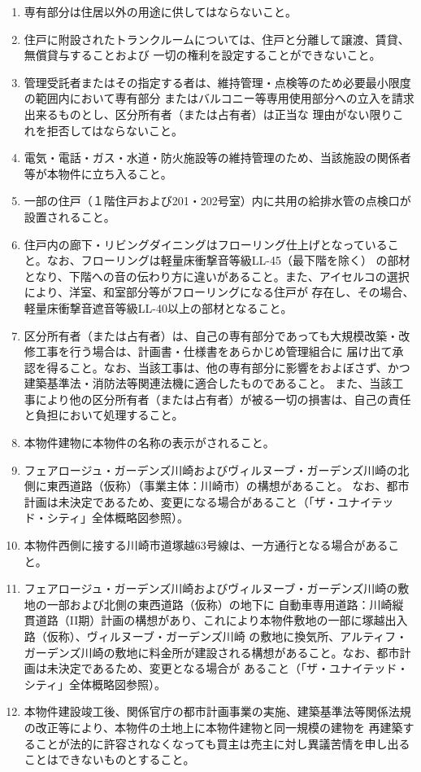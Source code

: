 \documentclass[12pt,uplatex,dvipdfmx]{jsarticle}
\begin{document}
\begin{enumerate}
\item 専有部分は住居以外の用途に供してはならないこと。
\item 住戸に附設されたトランクルームについては、住戸と分離して譲渡、賃貸、無償貸与することおよび
      一切の権利を設定することができないこと。
\item 管理受託者またはその指定する者は、維持管理・点検等のため必要最小限度の範囲内において専有部分
      またはバルコニー等専用使用部分への立入を請求出来るものとし、区分所有者（または占有者）は正当な
      理由がない限りこれを拒否してはならないこと。
\item 電気・電話・ガス・水道・防火施設等の維持管理のため、当該施設の関係者等が本物件に立ち入ること。
\item 一部の住戸（１階住戸および201・202号室）内に共用の給排水管の点検口が設置されること。
\item 住戸内の廊下・リビングダイニングはフローリング仕上げとなっていること。なお、フローリングは軽量床衝撃音等級LL-45（最下階を除く）
      の部材となり、下階への音の伝わり方に違いがあること。また、アイセルコの選択により、洋室、和室部分等がフローリングになる住戸が
      存在し、その場合、軽量床衝撃音遮音等級LL-40以上の部材となること。
\item 区分所有者（または占有者）は、自己の専有部分であっても大規模改築・改修工事を行う場合は、計画書・仕様書をあらかじめ管理組合に
      届け出て承認を得ること。なお、当該工事は、他の専有部分に影響をおよぼさず、かつ建築基準法・消防法等関連法機に適合したものであること。
      また、当該工事により他の区分所有者（または占有者）が被る一切の損害は、自己の責任と負担において処理すること。
\item 本物件建物に本物件の名称の表示がされること。
\item フェアロージュ・ガーデンズ川崎およびヴィルヌーブ・ガーデンズ川崎の北側に東西道路（仮称）（事業主体：川崎市）の構想があること。
      なお、都市計画は未決定であるため、変更になる場合があること（「ザ・ユナイテッド・シティ」全体概略図参照）。
\item 本物件西側に接する川崎市道塚越63号線は、一方通行となる場合があること。
\item フェアロージュ・ガーデンズ川崎およびヴィルヌーブ・ガーデンズ川崎の敷地の一部および北側の東西道路（仮称）の地下に
      自動車専用道路：川崎縦貫道路（II期）計画の構想があり、これにより本物件敷地の一部に塚越出入路（仮称）、ヴィルヌーブ・ガーデンズ川崎
      の敷地に換気所、アルティフ・ガーデンズ川崎の敷地に料金所が建設される構想があること。なお、都市計画は未決定であるため、変更となる場合が
      あること（「ザ・ユナイテッド・シティ」全体概略図参照）。
\item 本物件建設竣工後、関係官庁の都市計画事業の実施、建築基準法等関係法規の改正等により、本物件の土地上に本物件建物と同一規模の建物を
      再建築することが法的に許容されなくなっても買主は売主に対し異議苦情を申し出ることはできないものとすること。


\end{enumerate}
\end{document}
